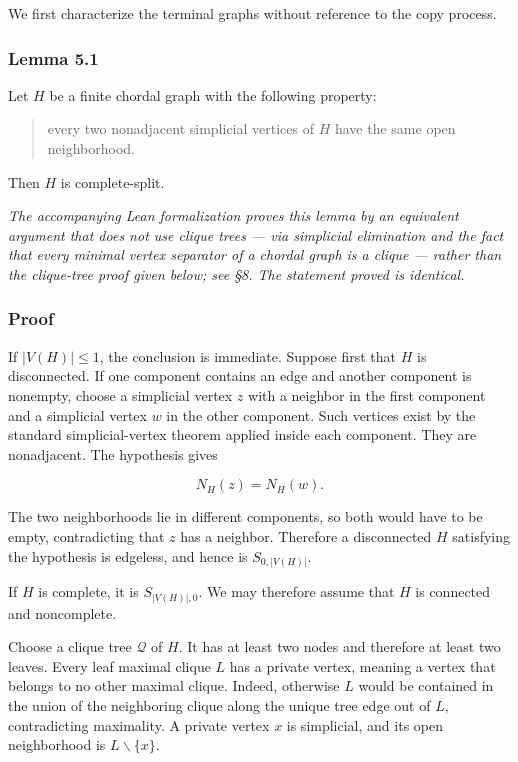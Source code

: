 \documentclass[
  11pt,
]{article}
\begin{document}
We first characterize the terminal graphs without reference to the copy
process.

\subsubsection{Lemma 5.1}\label{lemma-5.1}

Let \(H\) be a finite chordal graph with the following property:

\begin{quote}
every two nonadjacent simplicial vertices of \(H\) have the same open
neighborhood.
\end{quote}

Then \(H\) is complete-split.

\emph{The accompanying Lean formalization proves this lemma by an
equivalent argument that does not use clique trees --- via simplicial
elimination and the fact that every minimal vertex separator of a
chordal graph is a clique --- rather than the clique-tree proof given
below; see §8. The statement proved is identical.}

\subsubsection{Proof}\label{proof-5}

If \(|V(H)|\le1\), the conclusion is immediate. Suppose first that \(H\)
is disconnected. If one component contains an edge and another component
is nonempty, choose a simplicial vertex \(z\) with a neighbor in the
first component and a simplicial vertex \(w\) in the other component.
Such vertices exist by the standard simplicial-vertex theorem applied
inside each component. They are nonadjacent. The hypothesis gives

\[
N_H(z)=N_H(w).
\]

The two neighborhoods lie in different components, so both would have to
be empty, contradicting that \(z\) has a neighbor. Therefore a
disconnected \(H\) satisfying the hypothesis is edgeless, and hence is
\(S_{0,|V(H)|}\).

If \(H\) is complete, it is \(S_{|V(H)|,0}\). We may therefore assume
that \(H\) is connected and noncomplete.

Choose a clique tree \(\mathcal Q\) of \(H\). It has at least two nodes
and therefore at least two leaves. Every leaf maximal clique \(L\) has a
private vertex, meaning a vertex that belongs to no other maximal
clique. Indeed, otherwise \(L\) would be contained in the union of the
neighboring clique along the unique tree edge out of \(L\),
contradicting maximality. A private vertex \(x\) is simplicial, and its
open neighborhood is \(L\backslash\{x\}\).
\end{document}
